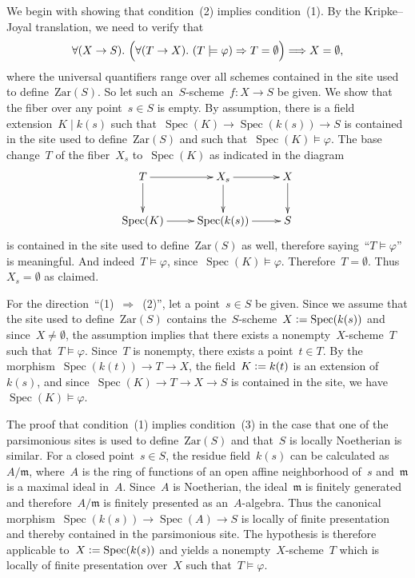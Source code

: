 \documentclass[10pt,reqno,a4paper]{amsbook}
\makeatletter
\theoremstyle{definition}
\theoremstyle{plain}
\theoremstyle{remark}
\newcommand{\mmm}{\mathfrak{m}}
\newcommand{\Zar}{\mathrm{Zar}}
\DeclareMathOperator{\Spec}{Spec}
\newcommand{\?}{\,{:}\,}
\renewcommand{\_}{\mathpunct{.}\,}
\newcommand{\fieldext}{\mathrel{|}}
\newcommand{\defeq}{\vcentcolon=}
\renewenvironment{proof}[1][\proofname]{\par
  \pushQED{\qed}%
  \normalfont \topsep6\p@\@plus6\p@\relax
  \trivlist
  \item[\hskip\labelsep
        \itshape
    #1\@addpunct{.}]\ignorespaces
}{%
  \popQED\endtrivlist\@endpefalse
}
\makeatother
\begin{document}
\begin{proof}We begin with showing that condition~(2) implies condition~(1). By
the Kripke--Joyal translation, we need to verify that
\[ \forall (X \to S)\_
  \Bigl(\forall (T \to X)\_ (T \models \varphi) \Rightarrow T = \emptyset\Bigr)
  \Longrightarrow X = \emptyset, \]
where the universal quantifiers range over all schemes contained in the site
used to define~$\Zar(S)$. So let such an~$S$-scheme~$f : X \to S$ be given. We
show that the fiber over any point~$s \in S$ is empty. By assumption, there is
a field extension~$K \fieldext k(s)$ such that~$\Spec(K) \to \Spec(k(s)) \to S$
is contained in the site used to define~$\Zar(S)$ and such that~$\Spec(K)
\models \varphi$. The base change~$T$ of the fiber~$X_s$ to~$\Spec(K)$ as
indicated in the diagram
\[ \xymatrix{
  T \ar[r]\ar[d] & X_s \ar[r]\ar[d] & X \ar[d] \\
  \Spec(K) \ar[r] & \Spec(k(s)) \ar[r] & S
} \]
is contained in the site used to define~$\Zar(S)$ as well, therefore
saying~``$T \models \varphi$'' is meaningful. And indeed~$T \models \varphi$,
since~$\Spec(K) \models \varphi$. Therefore~$T = \emptyset$. Thus~$X_s =
\emptyset$ as claimed.

For the direction~``(1)~$\Rightarrow$~(2)'', let a point~$s \in S$ be given.
Since we assume that the site used to define~$\Zar(S)$ contains
the~$S$-scheme~$X \defeq \Spec(k(s))$ and since~$X \neq \emptyset$, the
assumption implies that there exists a nonempty~$X$-scheme~$T$ such that~$T
\models \varphi$.  Since~$T$ is nonempty, there exists a point~$t \in T$. By
the morphism~$\Spec(k(t)) \to T \to X$, the field~$K \defeq k(t)$ is an
extension of~$k(s)$, and since~$\Spec(K) \to T \to X \to S$ is contained in the
site, we have~$\Spec(K) \models \varphi$.

The proof that condition~(1) implies condition~(3) in the case that one of the
parsimonious sites is used to define~$\Zar(S)$ and that~$S$ is locally
Noetherian is similar. For a closed point~$s \in S$, the residue field~$k(s)$
can be calculated as~$A/\mmm$, where~$A$ is the ring of functions of an open
affine neighborhood of~$s$ and~$\mmm$ is a maximal ideal in~$A$. Since~$A$ is
Noetherian, the ideal~$\mmm$ is finitely generated and therefore~$A/\mmm$ is
finitely presented as an~$A$-algebra. Thus the canonical morphism~$\Spec(k(s))
\to \Spec(A) \to S$ is locally of finite presentation and thereby contained in
the parsimonious site. The hypothesis is therefore applicable to~$X \defeq
\Spec(k(s))$ and yields a nonempty~$X$-scheme~$T$ which is locally of finite
presentation over~$X$ such that~$T \models \varphi$.


\end{proof}
\end{document}
